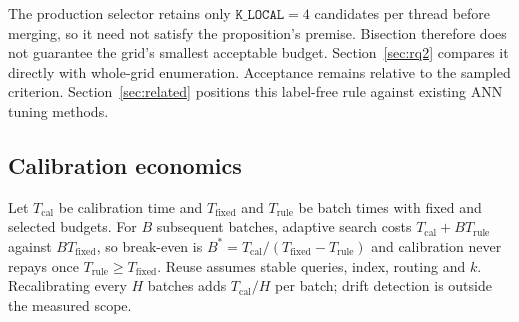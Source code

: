 The production selector retains only $\texttt{K\_LOCAL}=4$ candidates per
thread before merging, so it need not satisfy the proposition's premise.
Bisection therefore does not guarantee the grid's smallest acceptable budget.
Section~\ref{sec:rq2} compares it directly with whole-grid enumeration.
Acceptance remains relative to the sampled criterion. Section~\ref{sec:related}
positions this label-free rule against existing ANN tuning methods.

\subsection{Calibration economics}
Let $T_{\mathrm{cal}}$ be calibration time and $T_{\mathrm{fixed}}$ and
$T_{\mathrm{rule}}$ be batch times with fixed and selected budgets. For $B$
subsequent batches, adaptive search costs
$T_{\mathrm{cal}}+BT_{\mathrm{rule}}$ against $BT_{\mathrm{fixed}}$, so
break-even is
$B^{*}=T_{\mathrm{cal}}/(T_{\mathrm{fixed}}-T_{\mathrm{rule}})$ and
calibration never repays once $T_{\mathrm{rule}}\ge T_{\mathrm{fixed}}$. Reuse assumes stable queries, index, routing and $k$. Recalibrating every
$H$ batches adds $T_{\mathrm{cal}}/H$ per batch; drift detection is outside the
measured scope.
